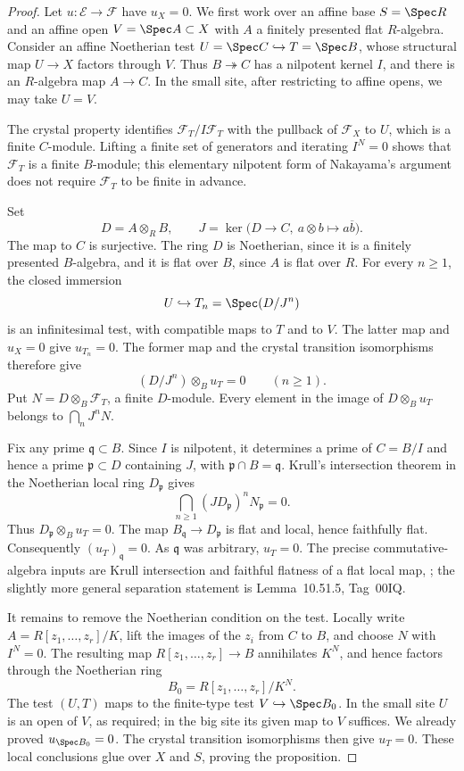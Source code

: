 \begin{proof}
Let $u:\mathcal E\to\mathcal F$ have $u_X=0$.  We first work over an affine base $S=\Spec R$ and an affine open $V=\Spec A\subset X$ with $A$ a finitely presented flat $R$-algebra.  Consider an affine Noetherian test $U=\Spec C\hookrightarrow T=\Spec B$, whose structural map $U\to X$ factors through $V$.  Thus $B\twoheadrightarrow C$ has a nilpotent kernel $I$, and there is an $R$-algebra map $A\to C$.  In the small site, after restricting to affine opens, we may take $U=V$.

The crystal property identifies $\mathcal F_T/I\mathcal F_T$ with the pullback of $\mathcal F_X$ to $U$, which is a finite $C$-module.  Lifting a finite set of generators and iterating $I^N=0$ shows that $\mathcal F_T$ is a finite $B$-module; this elementary nilpotent form of Nakayama's argument does not require $\mathcal F_T$ to be finite in advance.

Set
\[
 D=A\otimes_R B,\qquad
 J=\ker\bigl(D\longrightarrow C,\ a\otimes b\longmapsto a\overline b\bigr).
\]
The map to $C$ is surjective.  The ring $D$ is Noetherian, since it is a finitely presented $B$-algebra, and it is flat over $B$, since $A$ is flat over $R$.  For every $n\geq1$, the closed immersion
\[
 U\hookrightarrow T_n=\Spec(D/J^n)
\]
is an infinitesimal test, with compatible maps to $T$ and to $V$.  The latter map and $u_X=0$ give $u_{T_n}=0$.  The former map and the crystal transition isomorphisms therefore give
\[
 (D/J^n)\otimes_B u_T=0\qquad(n\geq1).
\]
Put $N=D\otimes_B\mathcal F_T$, a finite $D$-module.  Every element in the image of $D\otimes_B u_T$ belongs to $\bigcap_nJ^nN$.

Fix any prime $\mathfrak q\subset B$.  Since $I$ is nilpotent, it determines a prime of $C=B/I$ and hence a prime $\mathfrak p\subset D$ containing $J$, with $\mathfrak p\cap B=\mathfrak q$.  Krull's intersection theorem in the Noetherian local ring $D_{\mathfrak p}$ gives
\[
 \bigcap_{n\geq1}(JD_{\mathfrak p})^nN_{\mathfrak p}=0.
\]
Thus $D_{\mathfrak p}\otimes_Bu_T=0$.  The map $B_{\mathfrak q}\to D_{\mathfrak p}$ is flat and local, hence faithfully flat.  Consequently $(u_T)_{\mathfrak q}=0$.  As $\mathfrak q$ was arbitrary, $u_T=0$.  The precise commutative-algebra inputs are Krull intersection and faithful flatness of a flat local map, \citet[Lemmas~10.51.4 and~10.39.17, Tags~00IP and~00HR]{StacksProject}; the slightly more general separation statement is Lemma~10.51.5, Tag~00IQ.

It remains to remove the Noetherian condition on the test.  Locally write $A=R[z_1,\ldots,z_r]/K$, lift the images of the $z_i$ from $C$ to $B$, and choose $N$ with $I^N=0$.  The resulting map $R[z_1,\ldots,z_r]\to B$ annihilates $K^N$, and hence factors through the Noetherian ring
\[
 B_0=R[z_1,\ldots,z_r]/K^N.
\]
The test $(U,T)$ maps to the finite-type test
$V\hookrightarrow\Spec B_0$.  In the small site $U$ is an open of $V$, as required; in the big site its given map to $V$ suffices.  We already proved $u_{\Spec B_0}=0$.  The crystal transition isomorphisms then give $u_T=0$.  These local conclusions glue over $X$ and $S$, proving the proposition.
\end{proof}

